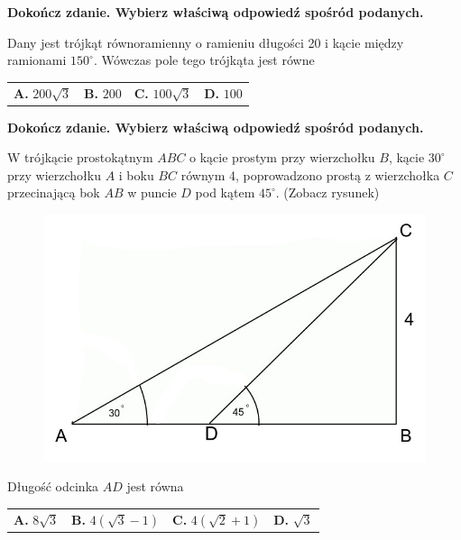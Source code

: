 \documentclass[12pt,a4paper]{article}
\theoremstyle{break}
\begin{document}
	
	\begin{zad}[0-1]
		\textbf{Dokończ zdanie. Wybierz właściwą odpowiedź spośród podanych.}
	\end{zad} 
	
	Dany jest trójkąt równoramienny o ramieniu długości 20 i kącie między ramionami $150^\circ$. Wówczas pole tego trójkąta jest równe
	
	\vspace{0.5cm}
	\begin{tabular}{p{3.5cm} p{3.5cm} p{3.5cm} p{3.5cm}}
		\textbf{A. }$200\sqrt{3}$&
		\textbf{B. }$200$&
		\textbf{C. }$100\sqrt{3}$&
		\textbf{D. }$100$\\
	\end{tabular}

	
	\begin{zad}[0-1]
		\textbf{Dokończ zdanie. Wybierz właściwą odpowiedź spośród podanych.}
	\end{zad} 
	
		W trójkącie prostokątnym $ABC$ o kącie prostym przy wierzchołku $B$, kącie $30^\circ$ przy wierzchołku $A$ i boku $BC$ równym 4, poprowadzono prostą z wierzchołka $C$ przecinającą bok $AB$ w puncie $D$ pod kątem $45^\circ$. (Zobacz rysunek)
	
	\begin{figure}[h]
		\centering
		\includegraphics[scale=0.5]{pm3.jpeg}
	\end{figure}

	Długość odcinka $AD$ jest równa
	
	\vspace{0.5cm}
	\begin{tabular}{p{3.5cm} p{3.5cm} p{3.5cm} p{3.5cm}}
		\textbf{A. }$8\sqrt{3}$&
		\textbf{B. }$4(\sqrt{3}-1)$&
		\textbf{C. }$4(\sqrt{2}+1)$&
		\textbf{D. }$\sqrt{3}$\\
	\end{tabular}
\end{document}
